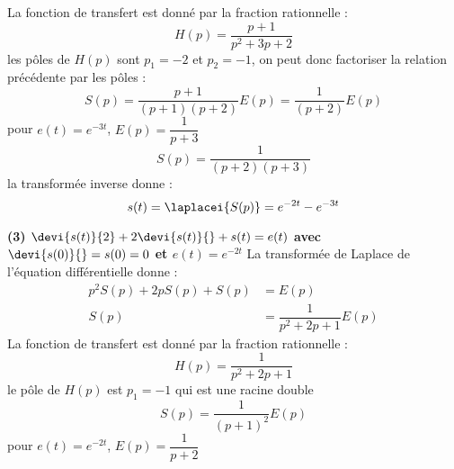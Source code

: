 La fonction de transfert est donné par la fraction rationnelle :
\[
H(p)=\dfrac{p+1}{p^2+3p+2}
\]
les pôles de $H(p)$ sont $p_1=-2$ et $p_2=-1$, on peut donc factoriser la 
relation précédente par les pôles :
\[
S(p) = \dfrac{p+1}{(p+1)(p+2)}E(p)=\dfrac{1}{(p+2)}E(p)
\]
pour $e(t)=e^{-3t}$, $E(p)=\dfrac{1}{p+3}$
\[
S(p)=\dfrac{1}{(p+2)(p+3)}
\]
la transformée inverse donne :
\[
s(t) = \laplacei{S(p)}=e^{-2t}-e^{-3t}
\]
\begin{center}
\end{center}
\newpage
\question{}
\textbf{(3) $\devi{s(t)}{2} + 2\devi{s(t)}{} + s(t)=e(t)$ 
avec $\devi{s(0)}{}=s(0)=0$ et $e(t) = e^{-2t}$}
La transformée de Laplace de l'équation différentielle donne :
\begin{align*}
    p^2S(p)+2pS(p)+S(p)&=E(p) \\
    S(p)&=\dfrac{1}{p^2+2p+1}E(p)
\end{align*}
La fonction de transfert est donné par la fraction rationnelle :
\[
H(p)=\dfrac{1}{p^2+2p+1}
\]
le pôle de $H(p)$ est $p_1=-1$ qui est une racine double
\[
S(p) = \dfrac{1}{(p+1)^2}E(p)
\]
pour $e(t)=e^{-2t}$, $E(p)=\dfrac{1}{p+2}$
